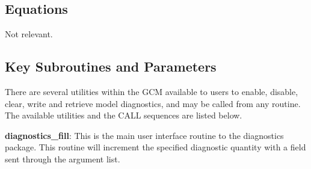 \subsection{Equations}
Not relevant.

\subsection{Key Subroutines and Parameters}
\label{sec:diagnostics:diagover}

\noindent
There are several utilities within the GCM available to users to enable, disable,
clear, write and retrieve model diagnostics, and may be called from any routine.  
The available utilities and the CALL sequences are listed below.

\noindent
{\bf diagnostics\_fill}:  This is the main user interface routine to the diagnostics
package. This routine will increment the specified diagnostic quantity with a field 
sent through the argument list.

